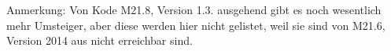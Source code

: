 Anmerkung: Von Kode M21.8, Version 1.3. ausgehend gibt es noch wesentlich mehr Umsteiger, aber diese werden hier nicht gelistet, weil sie sind von M21.6, Version 2014 aus nicht erreichbar sind. 

